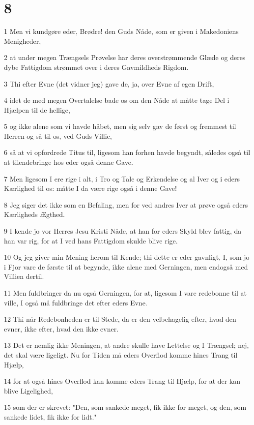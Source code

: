 \chapter{8}

\par 1 Men vi kundgøre eder, Brødre! den Guds Nåde, som er given i Makedoniens Menigheder,
\par 2 at under megen Trængsels Prøvelse har deres overstrømmende Glæde og deres dybe Fattigdom strømmet over i deres Gavmildheds Rigdom.
\par 3 Thi efter Evne (det vidner jeg) gave de, ja, over Evne af egen Drift,
\par 4 idet de med megen Overtalelse bade os om den Nåde at måtte tage Del i Hjælpen til de hellige,
\par 5 og ikke alene som vi havde håbet, men sig selv gav de først og fremmest til Herren og så til os, ved Guds Villie,
\par 6 så at vi opfordrede Titus til, ligesom han forhen havde begyndt, således også til at tilendebringe hos eder også denne Gave.
\par 7 Men ligesom I ere rige i alt, i Tro og Tale og Erkendelse og al Iver og i eders Kærlighed til os: måtte I da være rige også i denne Gave!
\par 8 Jeg siger det ikke som en Befaling, men for ved andres Iver at prøve også eders Kærligheds Ægthed.
\par 9 I kende jo vor Herres Jesu Kristi Nåde, at han for eders Skyld blev fattig, da han var rig, for at I ved hans Fattigdom skulde blive rige.
\par 10 Og jeg giver min Mening herom til Kende; thi dette er eder gavnligt, I, som jo i Fjor vare de første til at begynde, ikke alene med Gerningen, men endogså med Villien dertil.
\par 11 Men fuldbringer da nu også Gerningen, for at, ligesom I vare redebonne til at ville, I også må fuldbringe det efter eders Evne.
\par 12 Thi når Redebonheden er til Stede, da er den velbehagelig efter, hvad den evner, ikke efter, hvad den ikke evner.
\par 13 Det er nemlig ikke Meningen, at andre skulle have Lettelse og I Trængsel; nej, det skal være ligeligt. Nu for Tiden må eders Overflod komme hines Trang til Hjælp,
\par 14 for at også hines Overflod kan komme eders Trang til Hjælp, for at der kan blive Ligelighed,
\par 15 som der er skrevet: "Den, som sankede meget, fik ikke for meget, og den, som sankede lidet, fik ikke for lidt."
